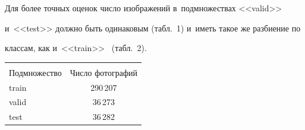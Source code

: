   Для более точных оценок чис\-ло изображений в~подмножествах <<valid>> 


и~<<test>> долж\-но быть одинаковым (табл.~1) и~иметь такое же разбиение по 


классам, как и~<<train>>~\cite{13-ar} (табл.~2).


  


  \begin{table}\small %


  \begin{center}


  \parbox{200pt}{


  }


  


  \vspace*{2ex}


  


  \tabcolsep=14pt


  \begin{tabular}{|l|c|}


  \hline


  &\\[-9pt]


  \multicolumn{1}{|c|}{Подмножество}&Число фотографий\\


  \hline


  \hspace*{8mm}train&290\,207\hphantom{9}\\


  \hspace*{8mm}valid&36\,273\\


  \hspace*{8mm}test&36\,282\\


  \hline


  \end{tabular}


  \end{center}


  \vspace*{-6pt}


  \end{table}








